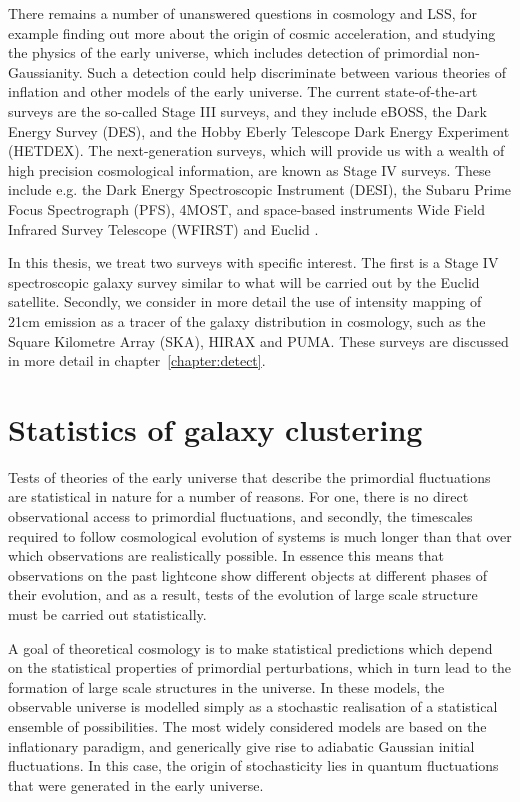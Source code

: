 There remains a number of unanswered questions in cosmology and LSS, for example finding out more about the origin of cosmic acceleration, and studying the physics of the early universe, which includes detection of primordial non-Gaussianity. Such a detection could help discriminate between various theories of inflation and other models of the early universe. The current state-of-the-art surveys are the so-called Stage III surveys, and they include eBOSS, the Dark Energy Survey (DES), and the Hobby Eberly Telescope Dark Energy Experiment (HETDEX). 
The next-generation surveys, which will provide us with a wealth of high precision cosmological information, are known as Stage IV surveys. These include e.g. the Dark Energy Spectroscopic Instrument (DESI), the Subaru Prime Focus Spectrograph (PFS), 4MOST, and space-based instruments Wide Field Infrared Survey Telescope (WFIRST) and Euclid .

In this thesis, we treat two surveys with specific interest. The first is a Stage IV spectroscopic galaxy survey similar to what will be carried out by the Euclid satellite. Secondly, we consider in more detail the use of intensity mapping of 21cm emission as a tracer of the galaxy distribution in cosmology, such as the Square Kilometre Array (SKA), HIRAX and PUMA. These surveys are discussed in more detail in chapter~\ref{chapter:detect}. 


\section{Statistics of galaxy clustering}
\label{section:introbisp} 

Tests of theories of the early universe that describe the primordial fluctuations are statistical in nature for a number of reasons. For one, there is no direct observational access to primordial fluctuations, and secondly, the timescales required to follow cosmological evolution of systems is much longer than that over which observations are realistically possible. In essence this means that observations on the past lightcone show different objects at different phases of their evolution, and as a result, tests of the evolution of large scale structure must be carried out statistically. 

A goal of theoretical cosmology is to make statistical predictions which depend on the statistical properties of primordial perturbations, which in turn lead to the formation of large scale structures in the universe. In these models, the observable universe is modelled simply as a stochastic realisation of a statistical ensemble of possibilities. The most widely considered models are based on the inflationary paradigm, and generically give rise to adiabatic Gaussian initial fluctuations. In this case, the origin of stochasticity lies in quantum fluctuations that were generated in the early universe. 

